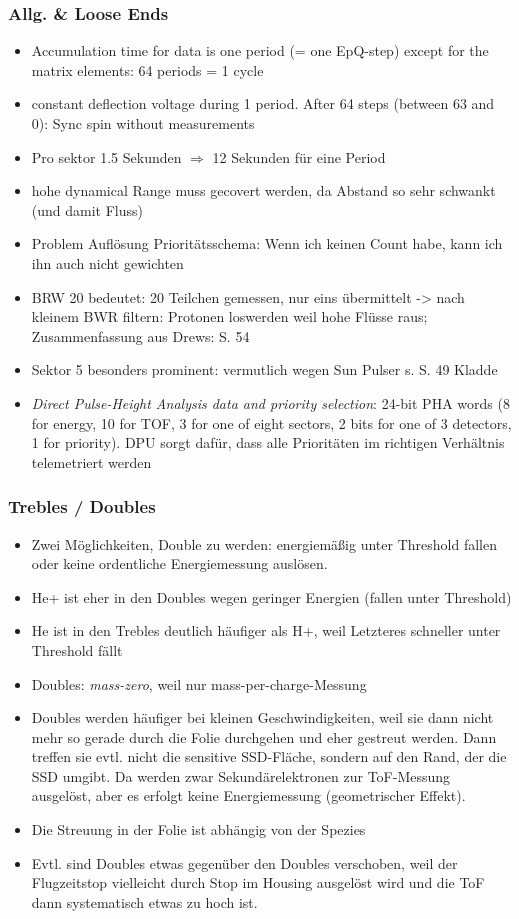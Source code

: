 \documentclass[]{article}
\begin{document}
\subsubsection{Allg. \& Loose Ends}
\begin{itemize}
	\item Accumulation time for data is one period (= one EpQ-step) except for the matrix elements: 64 periods = 1 cycle
	\item constant deflection voltage during 1 period. After 64 steps (between 63 and 0): Sync spin without measurements
	\item Pro sektor 1.5 Sekunden $\Rightarrow$ 12 Sekunden für eine Period
	\item hohe dynamical Range muss gecovert werden, da Abstand so sehr schwankt (und damit Fluss)
	\item Problem Auflösung Prioritätsschema: Wenn ich keinen Count habe, kann ich ihn auch nicht gewichten
	\item BRW 20 bedeutet: 20 Teilchen gemessen, nur eins übermittelt -> nach kleinem BWR filtern: Protonen loswerden weil hohe Flüsse raus; Zusammenfassung aus Drews: S. 54
	\item Sektor 5 besonders prominent: vermutlich wegen Sun Pulser s. S. 49 Kladde
	\item \textit{Direct Pulse-Height Analysis data and priority selection}: 24-bit PHA words (8 for energy, 10 for TOF, 3 for one of eight sectors, 2 bits for one of 3 detectors, 1 for priority). DPU sorgt dafür, dass alle Prioritäten im richtigen Verhältnis telemetriert werden
\end{itemize}
%
%
%
\subsubsection{Trebles / Doubles}
\begin{itemize}
	\item Zwei Möglichkeiten, Double zu werden: energiemäßig unter Threshold fallen oder keine ordentliche Energiemessung auslösen.
	\item He+ ist eher in den Doubles wegen geringer Energien (fallen unter Threshold)
	\item He ist in den Trebles deutlich häufiger als H+, weil Letzteres schneller unter Threshold fällt
	\item Doubles: \textit{mass-zero}, weil nur mass-per-charge-Messung
	\item Doubles werden häufiger bei kleinen Geschwindigkeiten, weil sie dann nicht mehr so gerade durch die Folie durchgehen und eher gestreut werden. Dann treffen sie evtl. nicht die sensitive SSD-Fläche, sondern auf den Rand, der die SSD umgibt. Da werden zwar Sekundärelektronen zur ToF-Messung ausgelöst, aber es erfolgt keine Energiemessung (geometrischer Effekt).
	\item Die Streuung in der Folie ist abhängig von der Spezies
	\item Evtl. sind Doubles etwas gegenüber den Doubles verschoben, weil der Flugzeitstop vielleicht durch Stop im Housing ausgelöst wird und die ToF dann systematisch etwas zu hoch ist.
\end{itemize}
%
%
%
\end{document}
